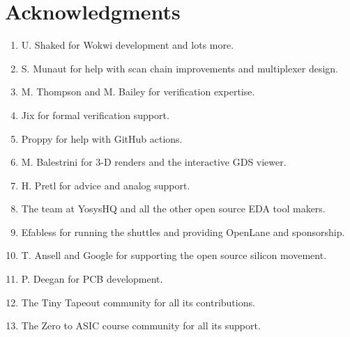 \section*{Acknowledgments}
\label{sec:acknowledgements}

\begin{enumerate}
    \item U. Shaked for Wokwi development and lots more.
    \item S. Munaut for help with scan chain improvements and multiplexer design.
    \item M. Thompson and M. Bailey for verification expertise.
    \item Jix for formal verification support.
    \item Proppy for help with GitHub actions.
    \item M. Balestrini for 3-D renders and the interactive GDS viewer.
    \item H. Pretl for advice and analog support.
    \item The team at YosysHQ and all the other open source EDA tool makers.
    \item Efabless for running the shuttles and providing OpenLane and sponsorship.
    \item T. Ansell and Google for supporting the open source silicon movement.
    \item P. Deegan for PCB development.
    \item The Tiny Tapeout community for all its contributions.
    \item The Zero to ASIC course community for all its support.
\end{enumerate}
